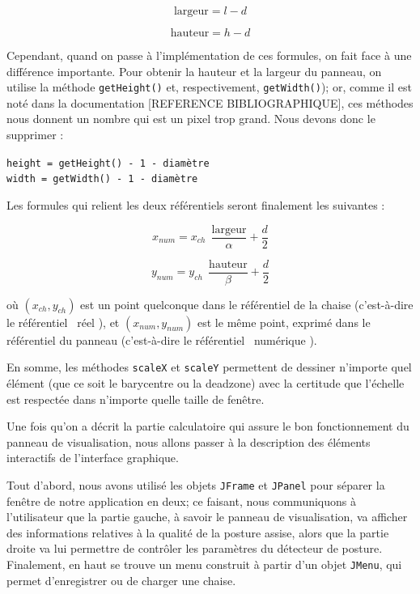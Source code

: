 \documentclass{polytech/polytech}
\begin{document}
\begin{equation}
\mathrm{largeur} = l - d
\end{equation}

\begin{equation}
\mathrm{hauteur} = h - d
\end{equation}

Cependant, quand on passe à l'implémentation de ces formules, on fait face à une différence importante. Pour obtenir la hauteur et la largeur du panneau, on utilise la méthode \texttt{getHeight()} et, respectivement, \texttt{getWidth()}); or, comme il est noté dans la documentation [REFERENCE BIBLIOGRAPHIQUE], ces méthodes nous donnent un nombre qui est un pixel trop grand. Nous devons donc le supprimer :

\begin{center}
\texttt{height = getHeight() - 1 - diamètre}\\
\texttt{width = getWidth() - 1 - diamètre}
\end{center}

Les formules qui relient les deux référentiels seront finalement les suivantes :

\begin{equation}
\label{eqn:form_ref_hor}
x_{num} = x_{ch}\ \ \frac{\mathrm{largeur}}{\alpha} + \frac{d}{2}
\end{equation}

\begin{equation}
\label{eqn:form_ref_vert}
y_{num} = y_{ch}\ \ \frac{\mathrm{hauteur}}{\beta} + \frac{d}{2}
\end{equation}

où $(x_{ch}, y_{ch})$ est un point quelconque dans le référentiel de la chaise (c'est-à-dire le référentiel \guillemotleft\ réel \guillemotright ), et $(x_{num}, y_{num})$ est le même point, exprimé dans le référentiel du panneau (c'est-à-dire le référentiel \guillemotleft\ numérique \guillemotright ).

En somme, les méthodes \texttt{scaleX} et \texttt{scaleY} permettent de dessiner n'importe quel élément (que ce soit le barycentre ou la deadzone) avec la certitude que l'échelle est respectée dans n'importe quelle taille de fenêtre.

Une fois qu'on a décrit la partie calculatoire qui assure le bon fonctionnement du panneau de visualisation, nous allons passer à la description des éléments interactifs de l'interface graphique.

Tout d'abord, nous avons utilisé les objets \texttt{JFrame} et \texttt{JPanel} pour séparer la fenêtre de notre application en deux; ce faisant, nous communiquons à l'utilisateur que la partie gauche, à savoir le panneau de visualisation, va afficher des informations relatives à la qualité de la posture assise, alors que la partie droite va lui permettre de contrôler les paramètres du détecteur de posture. Finalement, en haut se trouve un menu construit à partir d'un objet \texttt{JMenu}, qui permet d'enregistrer ou de charger une chaise.
\end{document}
